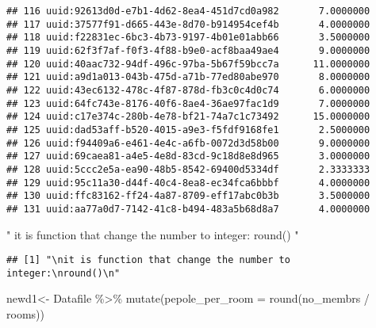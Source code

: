 \documentclass[
]{article}
\newenvironment{Shaded}{\begin{snugshade}}{\end{snugshade}}
\newcommand{\AttributeTok}[1]{\textcolor[rgb]{0.77,0.63,0.00}{#1}}
\newcommand{\FunctionTok}[1]{\textcolor[rgb]{0.00,0.00,0.00}{#1}}
\newcommand{\NormalTok}[1]{#1}
\newcommand{\OtherTok}[1]{\textcolor[rgb]{0.56,0.35,0.01}{#1}}
\newcommand{\SpecialCharTok}[1]{\textcolor[rgb]{0.00,0.00,0.00}{#1}}
\newcommand{\StringTok}[1]{\textcolor[rgb]{0.31,0.60,0.02}{#1}}
\begin{document}
\begin{verbatim}
## 116 uuid:92613d0d-e7b1-4d62-8ea4-451d7cd0a982       7.0000000
## 117 uuid:37577f91-d665-443e-8d70-b914954cef4b       4.0000000
## 118 uuid:f22831ec-6bc3-4b73-9197-4b01e01abb66       3.5000000
## 119 uuid:62f3f7af-f0f3-4f88-b9e0-acf8baa49ae4       9.0000000
## 120 uuid:40aac732-94df-496c-97ba-5b67f59bcc7a      11.0000000
## 121 uuid:a9d1a013-043b-475d-a71b-77ed80abe970       8.0000000
## 122 uuid:43ec6132-478c-4f87-878d-fb3c0c4d0c74       6.0000000
## 123 uuid:64fc743e-8176-40f6-8ae4-36ae97fac1d9       7.0000000
## 124 uuid:c17e374c-280b-4e78-bf21-74a7c1c73492      15.0000000
## 125 uuid:dad53aff-b520-4015-a9e3-f5fdf9168fe1       2.5000000
## 126 uuid:f94409a6-e461-4e4c-a6fb-0072d3d58b00       9.0000000
## 127 uuid:69caea81-a4e5-4e8d-83cd-9c18d8e8d965       3.0000000
## 128 uuid:5ccc2e5a-ea90-48b5-8542-69400d5334df       2.3333333
## 129 uuid:95c11a30-d44f-40c4-8ea8-ec34fca6bbbf       4.0000000
## 130 uuid:ffc83162-ff24-4a87-8709-eff17abc0b3b       3.5000000
## 131 uuid:aa77a0d7-7142-41c8-b494-483a5b68d8a7       4.0000000
\end{verbatim}

\begin{Shaded}
\begin{Highlighting}[]
\StringTok{"}
\StringTok{it is function that change the number to integer:}
\StringTok{round()}
\StringTok{"}
\end{Highlighting}
\end{Shaded}

\begin{verbatim}
## [1] "\nit is function that change the number to integer:\nround()\n"
\end{verbatim}

\begin{Shaded}
\begin{Highlighting}[]
\NormalTok{newd1}\OtherTok{\textless{}{-}}\NormalTok{ Datafile }\SpecialCharTok{\%\textgreater{}\%} 
  \FunctionTok{mutate}\NormalTok{(}\AttributeTok{pepole\_per\_room =} \FunctionTok{round}\NormalTok{(no\_membrs }\SpecialCharTok{/}\NormalTok{ rooms))}
\end{Highlighting}
\end{Shaded}

\begin{Shaded}
\end{Shaded}
\end{document}
